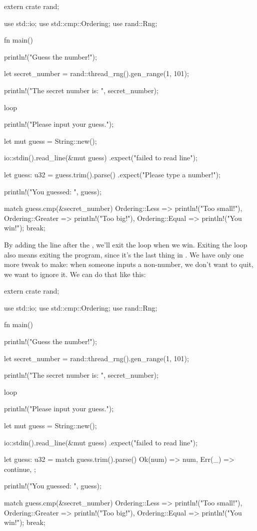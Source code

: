 \begin{rustc}
extern crate rand;

use std::io;
use std::cmp::Ordering;
use rand::Rng;

fn main() {
    println!("Guess the number!");

    let secret_number = rand::thread_rng().gen_range(1, 101);

    println!("The secret number is: {}", secret_number);

    loop {
        println!("Please input your guess.");

        let mut guess = String::new();

        io::stdin().read_line(&mut guess)
            .expect("failed to read line");

        let guess: u32 = guess.trim().parse()
            .expect("Please type a number!");

        println!("You guessed: {}", guess);

        match guess.cmp(&secret_number) {
            Ordering::Less    => println!("Too small!"),
            Ordering::Greater => println!("Too big!"),
            Ordering::Equal   => {
                println!("You win!");
                break;
            }
        }
    }
}
\end{rustc}

By adding the  line after the , we'll exit the loop when we win. Exiting the loop also means exiting 
the program, since it's the last thing in . We have only one more tweak to make: when someone inputs a non-number, 
we don't want to quit, we want to ignore it. We can do that like this:

\begin{rustc}
extern crate rand;

use std::io;
use std::cmp::Ordering;
use rand::Rng;

fn main() {
    println!("Guess the number!");

    let secret_number = rand::thread_rng().gen_range(1, 101);

    println!("The secret number is: {}", secret_number);

    loop {
        println!("Please input your guess.");

        let mut guess = String::new();

        io::stdin().read_line(&mut guess)
            .expect("failed to read line");

        let guess: u32 = match guess.trim().parse() {
            Ok(num) => num,
            Err(_) => continue,
        };

        println!("You guessed: {}", guess);

        match guess.cmp(&secret_number) {
            Ordering::Less    => println!("Too small!"),
            Ordering::Greater => println!("Too big!"),
            Ordering::Equal   => {
                println!("You win!");
                break;
            }
        }
    }
}
\end{rustc}


